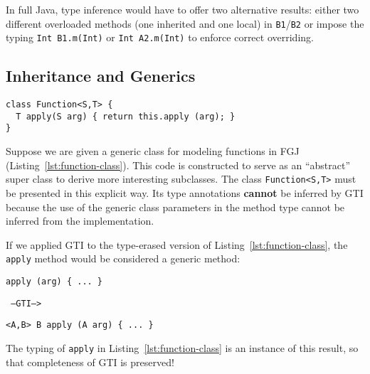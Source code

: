 

In full Java, type inference would have to offer two alternative
results: either two different
overloaded methods (one inherited and one local) in \texttt{B1}/\texttt{B2} or
impose the typing \texttt{Int B1.m(Int)} or \texttt{Int A2.m(Int)} to enforce correct overriding. 


\subsection{Inheritance and Generics}
\label{sec:inheritance-generics}


\begin{lstlisting}[float,caption={Function class}, label={lst:function-class},style=fgj]
class Function<S,T> {
  T apply(S arg) { return this.apply (arg); }
}
\end{lstlisting}
Suppose we are given a generic class for modeling functions in  FGJ (Listing~\ref{lst:function-class}).
This code is constructed to serve as an ``abstract'' super class to derive more
interesting subclasses.
The class \texttt{Function<S,T>} must be presented in this explicit
way. Its type annotations \textbf{cannot} be inferred by GTI because
the use of the generic class parameters in the method type cannot be inferred from the
implementation.

If we applied GTI to the type-erased version of
Listing~\ref{lst:function-class}, the \texttt{apply} method would be considered a generic method: 
\begin{center}
  \begin{minipage}{0.3\linewidth}
\begin{lstlisting}[style=tfgj]
apply (arg) { ... }
\end{lstlisting}
  \end{minipage}
  \hfill\texttt{ --GTI--> }\hfill
  \begin{minipage}{0.45\linewidth}
\begin{lstlisting}[style=fgj]
<A,B> B apply (A arg) { ... }
\end{lstlisting}
  \end{minipage}
\end{center}
The typing of \texttt{apply} in Listing~\ref{lst:function-class} is an
instance of this result, so that completeness of GTI is preserved!


